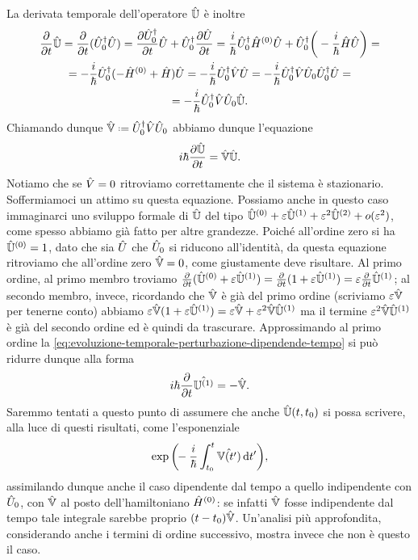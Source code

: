 La derivata temporale dell'operatore $\hat{\mathbb U}$ è inoltre
\begin{multline}
	\frac{\partial {}}{\partial {t}}\hat{\mathbb U}=\frac{\partial {}}{\partial {t}}(\hat{U}_0^\dagger\hat{U})=\frac{\partial {\hat{U}_0^\dagger}}{\partial {t}}\hat{U}+\hat{U}_0^\dagger\frac{\partial {\hat{U}}}{\partial {t}}=\frac{i}{\hbar}\hat{U}_0^\dagger\hat{H}^{(0)}\hat{U}+\hat{U}_0^\dagger\bigg(-\frac{i}{\hbar}\hat{H}\hat{U}\bigg)=\\=
	-\frac{i}{\hbar}\hat{U}_0^\dagger(-\hat{H}^{(0)}+\hat{H})\hat{U}=-\frac{i}{\hbar}\hat{U}_0^\dagger\hat{V}\hat{U}=-\frac{i}{\hbar}\hat{U}_0^\dagger\hat{V}\hat{U}_0\hat{U}_0^\dagger \hat{U} =\\= 
	-\frac{i}{\hbar}\hat{U}_0^\dagger\hat{V}\hat{U}_0 \hat{\mathbb U}.
\end{multline}
Chiamando dunque $\op{\mathbb V}\defeq\adj{\op U_0}\op V\op U_0$ abbiamo dunque l'equazione
\begin{equation}
	i\hbar\frac{\partial {\hat{\mathbb U}}}{\partial {t}}=\hat{\mathbb V}\hat{\mathbb U}.
	\label{eq:evoluzione-temporale-perturbazione-dipendende-tempo}
\end{equation}
Notiamo che se $\hat{V}=0$ ritroviamo correttamente che il sistema è stazionario.
Soffermiamoci un attimo su questa equazione.
Possiamo anche in questo caso immaginarci uno sviluppo formale di $\hat{\mathbb U}$ del tipo $\hat{\mathbb U}^{(0)}+\varepsilon\hat{\mathbb U}^{(1)}+\varepsilon^2\hat{\mathbb U}^{(2)}+o(\varepsilon^2)$, come spesso abbiamo già fatto per altre grandezze.
Poich\'e all'ordine zero si ha $\hat{\mathbb U}^{(0)}=1$, dato che sia $\hat{U}$ che $\hat{U}_0$ si riducono all'identità, da questa equazione ritroviamo che all'ordine zero $\hat{\mathbb V}=0$, come giustamente deve risultare.
Al primo ordine, al primo membro troviamo $\frac{\partial {}}{\partial {t}}(\hat{\mathbb U}^{(0)}+\varepsilon\hat{\mathbb U}^{(1)})=\frac{\partial {}}{\partial {t}}(1+\varepsilon\hat{\mathbb U}^{(1)})=\varepsilon\frac{\partial {}}{\partial {t}}\hat{\mathbb U}^{(1)}$; al secondo membro, invece, ricordando che $\hat{\mathbb V}$ è già del primo ordine (scriviamo $\varepsilon\hat{\mathbb V}$ per tenerne conto) abbiamo $\varepsilon\hat{\mathbb V}(1+\varepsilon\hat{\mathbb U}^{(1)})=\varepsilon\hat{\mathbb V}+\varepsilon^2\hat{\mathbb V}\hat{\mathbb U}^{(1)}$ ma il termine $\varepsilon^2\hat{\mathbb V}\hat{\mathbb U}^{(1)}$ è già del secondo ordine ed è quindi da trascurare.
Approssimando al primo ordine la \eqref{eq:evoluzione-temporale-perturbazione-dipendende-tempo} si può ridurre dunque alla forma
\begin{equation}
	i\hbar\frac{\partial {}}{\partial {t}}\hat{\mathbb U^{(1)}}=-\hat{\mathbb V}.
	\label{eq:evoluzione-temporale-perturbazione-dipendende-tempo-primo-ordine}
\end{equation}
Saremmo tentati a questo punto di assumere che anche $\hat{\mathbb U}(t,t_0)$ si possa scrivere, alla luce di questi risultati, come l'esponenziale
\begin{equation}
	\exp\bigg(\!\!-\frac{i}{\hbar}\int_{t_0}^t\hat{\mathbb V(t')}\,\textup{d} t'\bigg),
\end{equation}
assimilando dunque anche il caso dipendente dal tempo a quello indipendente con $\hat{U}_0$, con $\hat{\mathbb V}$ al posto dell'hamiltoniano $\hat{H}^{(0)}$: se infatti $\hat{\mathbb V}$ fosse indipendente dal tempo tale integrale sarebbe proprio $(t-t_0)\hat{\mathbb V}$.
Un'analisi più approfondita, considerando anche i termini di ordine successivo, mostra invece che non è questo il caso.

